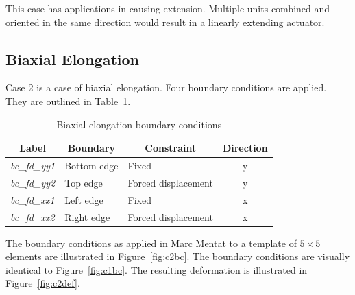 This case has applications in causing extension. Multiple units combined and oriented in the same direction would result in a linearly extending actuator.

\subsection{Biaxial Elongation}

Case 2 is a case of biaxial elongation. Four boundary conditions are applied. They are outlined in Table~\ref{tab:c2}.

\begin{table}[H]
\centering
\begin{tabular}{@{}lllc@{}}
\toprule
\multicolumn{1}{c}{\textbf{Label}} & \multicolumn{1}{c}{\textbf{Boundary}} & \multicolumn{1}{c}{\textbf{Constraint}} & \textbf{Direction} \\ \midrule
\textit{bc\_fd\_yy1} & Bottom edge & Fixed               & y \\
\textit{bc\_fd\_yy2} & Top edge    & Forced displacement & y \\
\textit{bc\_fd\_xx1} & Left edge   & Fixed               & x \\
\textit{bc\_fd\_xx2} & Right edge  & Forced displacement & x \\ \bottomrule
\end{tabular}
\caption{Biaxial elongation boundary conditions}
\label{tab:c2}
\end{table}

The boundary conditions as applied in Marc Mentat to a template of $5\times 5$ elements are illustrated in Figure~\ref{fig:c2bc}. The boundary conditions are visually identical to Figure~\ref{fig:c1bc}. The resulting deformation is illustrated in Figure~\ref{fig:c2def}.

